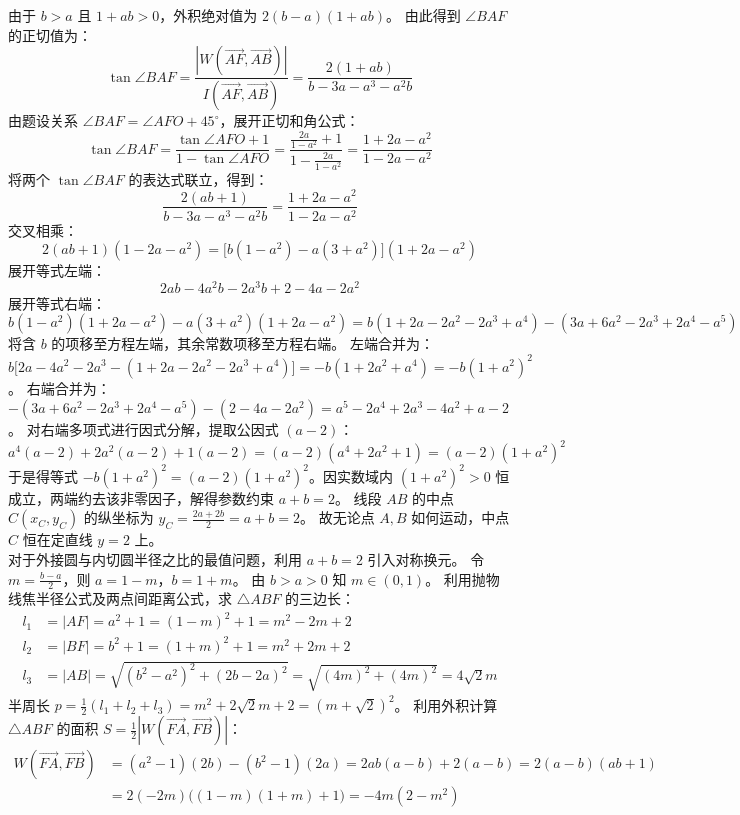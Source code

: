 \begin{solution}
由于 $b > a$ 且 $1+ab > 0$，外积绝对值为 $2(b-a)(1+ab)$。
由此得到 $\angle BAF$ 的正切值为：
\[ \tan \angle BAF = \frac{|W(\overrightarrow{AF}, \overrightarrow{AB})|}{I(\overrightarrow{AF}, \overrightarrow{AB})} = \frac{2(1+ab)}{b - 3a - a^3 - a^2 b} \]
由题设关系 $\angle BAF = \angle AFO + 45^\circ$，展开正切和角公式：
\[ \tan \angle BAF = \frac{\tan \angle AFO + 1}{1 - \tan \angle AFO} = \frac{\frac{2a}{1-a^2} + 1}{1 - \frac{2a}{1-a^2}} = \frac{1 + 2a - a^2}{1 - 2a - a^2} \]
将两个 $\tan \angle BAF$ 的表达式联立，得到：
\[ \frac{2(ab+1)}{b - 3a - a^3 - a^2 b} = \frac{1 + 2a - a^2}{1 - 2a - a^2} \]
交叉相乘：
\[ 2(ab+1)(1 - 2a - a^2) = \big[ b(1-a^2) - a(3+a^2) \big] (1 + 2a - a^2) \]
展开等式左端：
\[ 2ab - 4a^2 b - 2a^3 b + 2 - 4a - 2a^2 \]
展开等式右端：
\[ b(1-a^2)(1+2a-a^2) - a(3+a^2)(1+2a-a^2) = b(1 + 2a - 2a^2 - 2a^3 + a^4) - (3a + 6a^2 - 2a^3 + 2a^4 - a^5) \]
将含 $b$ 的项移至方程左端，其余常数项移至方程右端。
左端合并为：$b \big[ 2a - 4a^2 - 2a^3 - (1 + 2a - 2a^2 - 2a^3 + a^4) \big] = -b(1 + 2a^2 + a^4) = -b(1+a^2)^2$。
右端合并为：$-(3a + 6a^2 - 2a^3 + 2a^4 - a^5) - (2 - 4a - 2a^2) = a^5 - 2a^4 + 2a^3 - 4a^2 + a - 2$。
对右端多项式进行因式分解，提取公因式 $(a-2)$：
\[ a^4(a-2) + 2a^2(a-2) + 1(a-2) = (a-2)(a^4 + 2a^2 + 1) = (a-2)(1+a^2)^2 \]
于是得等式 $-b(1+a^2)^2 = (a-2)(1+a^2)^2$。因实数域内 $(1+a^2)^2 > 0$ 恒成立，两端约去该非零因子，解得参数约束 $a+b = 2$。
线段 $AB$ 的中点 $C(x_C, y_C)$ 的纵坐标为 $y_C = \frac{2a + 2b}{2} = a+b = 2$。
故无论点 $A, B$ 如何运动，中点 $C$ 恒在定直线 $y = 2$ 上。\\
对于外接圆与内切圆半径之比的最值问题，利用 $a+b=2$ 引入对称换元。
令 $m = \frac{b-a}{2}$，则 $a = 1-m$，$b = 1+m$。
由 $b > a > 0$ 知 $m \in (0, 1)$。
利用抛物线焦半径公式及两点间距离公式，求 $\triangle ABF$ 的三边长：
\begin{align*}
l_1 &= |AF| = a^2 + 1 = (1-m)^2 + 1 = m^2 - 2m + 2 \\
l_2 &= |BF| = b^2 + 1 = (1+m)^2 + 1 = m^2 + 2m + 2 \\
l_3 &= |AB| = \sqrt{(b^2-a^2)^2 + (2b-2a)^2} = \sqrt{(4m)^2 + (4m)^2} = 4\sqrt{2}m
\end{align*}
半周长 $p = \frac{1}{2}(l_1 + l_2 + l_3) = m^2 + 2\sqrt{2}m + 2 = (m+\sqrt{2})^2$。
利用外积计算 $\triangle ABF$ 的面积 $S = \frac{1}{2} |W(\overrightarrow{FA}, \overrightarrow{FB})|$：
\begin{align*}
W(\overrightarrow{FA}, \overrightarrow{FB}) &= (a^2-1)(2b) - (b^2-1)(2a) = 2ab(a-b) + 2(a-b) = 2(a-b)(ab+1) \\
&= 2(-2m) \big( (1-m)(1+m) + 1 \big) = -4m(2-m^2)

\end{align*}
\end{solution}
